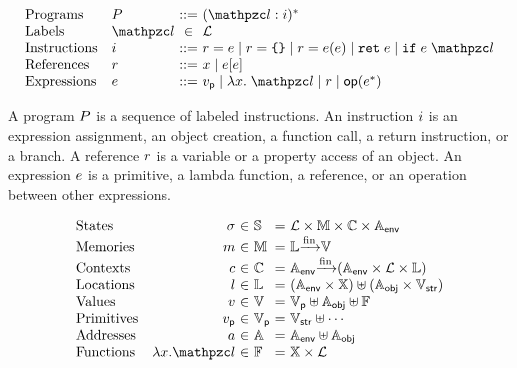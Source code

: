 \[
  \begin{array}{ll@{~}c@{~}l}
    \text{Programs} & \prog &::=& (\lab: \inst)^*\\

    \text{Labels} & \lab &\in& \labset\\

    \text{Instructions} & \inst &::=&
    \refer = \expr \mid
    \refer = \kwobj \mid
    \refer = \expr ( \expr ) \mid
    \kwret \; \expr \mid
    \kwif \; \expr \; \lab\\

    \text{References} & \refer &::=&
    x \mid
    \expr [ \expr ]\\

    \text{Expressions} & \expr &::=&
    \pval \mid
    \lambda x. \; \lab \mid
    \refer \mid
    \op(\expr^*)\\
  \end{array}
\]

A program $P$ is a sequence of labeled instructions. An instruction $i$
is an expression assignment, an object creation, a function call, a return
instruction, or a branch.  A reference $r$ is a variable or a property
access of an object.  An expression $e$ is a primitive, a lambda function, a
reference, or an operation between other expressions.

\[
  \begin{array}{lr@{~}c@{~}l@{~}c@{~}l}
    \text{States} & \st &\in& \stset &=& \labset \times \memset \times
    \ctxtset \times \eaddrset\\
    \text{Memories} & \mem &\in& \memset &=& \locset \finmap \valset\\
    \text{Contexts} & \ctxt &\in& \ctxtset &=& \eaddrset \finmap (\eaddrset
    \times \labset \times \locset)\\
    \text{Locations} & \loc &\in& \locset &=& (\eaddrset \times \varset) \uplus
    (\oaddrset \times \strset)\\
    \text{Values} & \val &\in& \valset &=& \pvalset \uplus \oaddrset \uplus
    \fvalset\\
    \text{Primitives} & \pval &\in& \pvalset &=& \strset \uplus \cdots\\
    \text{Addresses} & \addr &\in& \addrset &=& \eaddrset \uplus \oaddrset\\
    \text{Functions} & \fval{x}{\lab} &\in& \fvalset &=& \varset \times
    \labset\\
  \end{array}
\]

